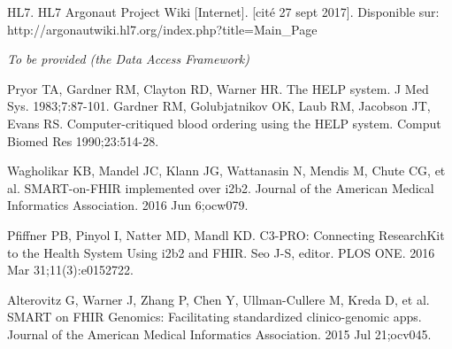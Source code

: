 \documentclass{amia}
\begin{document}
\begin{thebibliography}{1}
HL7. HL7 Argonaut Project Wiki [Internet]. [cité 27 sept 2017]. Disponible sur: http://argonautwiki.hl7.org/index.php?title=Main\_Page

\emph{To be provided (the Data Access Framework)}

Pryor TA, Gardner RM, Clayton RD, Warner HR. The HELP system. J Med Sys. 1983;7:87-101.
Gardner RM, Golubjatnikov OK, Laub RM, Jacobson JT, Evans RS. Computer-critiqued blood ordering using the HELP system. Comput Biomed Res 1990;23:514-28.

Wagholikar KB, Mandel JC, Klann JG, Wattanasin N, Mendis M, Chute CG, et al. SMART-on-FHIR implemented over i2b2. Journal of the American Medical Informatics Association. 2016 Jun 6;ocw079. 

Pfiffner PB, Pinyol I, Natter MD, Mandl KD. C3-PRO: Connecting ResearchKit to the Health System Using i2b2 and FHIR. Seo J-S, editor. PLOS ONE. 2016 Mar 31;11(3):e0152722. 

Alterovitz G, Warner J, Zhang P, Chen Y, Ullman-Cullere M, Kreda D, et al. SMART on FHIR Genomics: Facilitating standardized clinico-genomic apps. Journal of the American Medical Informatics Association. 2015 Jul 21;ocv045. 

\end{thebibliography}
\end{document}
